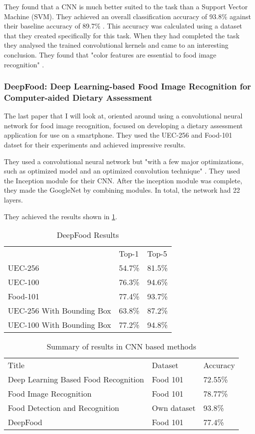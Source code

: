 They found that a CNN is much better suited to the task than a Support Vector
Machine (SVM). They achieved an overall classification accuracy of 93.8\%
against their baseline accuracy of 89.7\% \textcite{kagayaFood}. This accuracy
was calculated using a dataset that they created specifically for this task.
When they had completed the task they analysed the trained convolutional kernels
and came to an interesting conclusion. They found that "color features are
essential to food image recognition" \textcite{kagayaFood}.

\subsubsection*{DeepFood: Deep Learning-based Food Image Recognition for
Computer-aided Dietary Assessment}
The last paper that I will look at, oriented around using a convolutional neural
network for food image recognition, focused on developing a dietary assessment
application for use on a smartphone. They used the UEC-256 and Food-101 datset
for their experiments and achieved impressive results.

They used a convolutional neural network but "with a few major optimizations,
such as optimized model and an optimized convolution technique"
\textcite{deepFood}. They used the Inception module for their CNN. After the
inception module was complete, they made the GoogleNet by combining modules. In
total, the network had 22 layers.

They achieved the results shown in \ref{resultsDeepFood}.

\begin{table}[]
	\centering
	\caption{DeepFood Results}
	\label{resultsDeepFood}
	\begin{tabular}{lll}
		& Top-1  & Top-5  \\
		UEC-256                   & 54.7\% & 81.5\% \\
		UEC-100                   & 76.3\% & 94.6\% \\
		Food-101                  & 77.4\% & 93.7\% \\
		UEC-256 With Bounding Box & 63.8\% & 87.2\% \\
		  UEC-100 With Bounding Box & 77.2\% & 94.8\%
	\end{tabular}
\end{table}

\begin{table}[]
	\centering
	\caption{Summary of results in CNN based methods}
	\label{cnn_summary}
	\begin{tabular}{lll}
		Title                                & Dataset     & Accuracy \\
		Deep Learning Based Food Recognition & Food 101    & 72.55\%  \\
		Food Image Recognition               & Food 101    & 78.77\%  \\
		Food Detection and Recognition       & Own dataset & 93.8\%   \\
		DeepFood                             & Food 101    & 77.4\%  
	\end{tabular}
\end{table}

